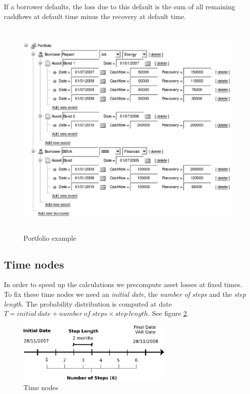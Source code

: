 \documentclass[a4paper,12pt,final]{article}
\begin{document}
If a borrower defaults, the loss due to this default is the sum of all remaining
cashflows at default time minus the recovery at default time.

\begin{figure}[!hbt]
\begin{center}
\includegraphics[height=11cm, angle=0]{./images/portfolio.eps}
\caption{Portfolio example}
\label{portfolio}
\end{center}
\end{figure}
\FloatBarrier

\subsection{Time nodes}
In order to speed up the calculations we precompute asset losses at fixed 
times. To fix these time nodes we need an \emph{initial date}, the 
\emph{number of steps} and the \emph{step length}. The probability distribution
is computed at date $T = initial\ date + number\ of\ steps \times step\ length$.
See figure \ref{cctime1}.

\begin{figure}[!hbt]
\begin{center}
\includegraphics[height=3.0cm, angle=0]{./images/cctime1.eps}
\caption{Time nodes}
\label{cctime1}
\end{center}
\end{figure}
\FloatBarrier
\end{document}
